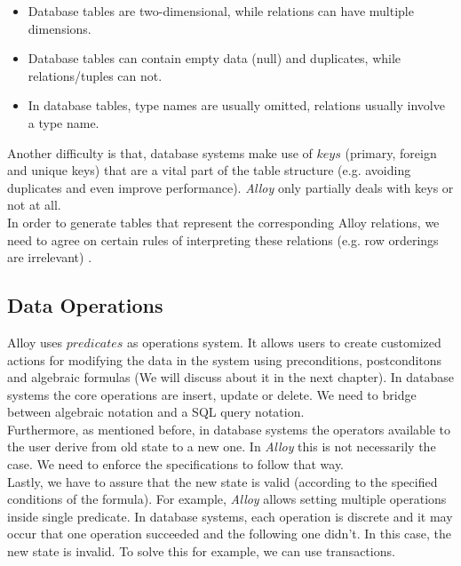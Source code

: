 \documentclass[oneside]{book}
\begin{document}
\begin{itemize}
	\item Database tables are two-dimensional, while relations can have multiple dimensions.
	\item Database tables can contain empty data (null) and duplicates, while relations/tuples can not.
	\item In database tables, type names are usually omitted, relations usually involve a type name.
\end{itemize}

Another difficulty is that, database systems make use of $keys$  (primary, foreign and unique keys) that are a vital part of the table structure (e.g. avoiding duplicates and even improve performance). \textit{Alloy} only partially deals with keys or not at all. \\

In order to generate tables that represent the corresponding Alloy relations, we need to agree on certain rules of interpreting these relations (e.g. row orderings are irrelevant) \cite[p.~151]{introtodb}.

\subsection{Data Operations}

Alloy uses $predicates$ as operations system. It allows users to create customized actions for modifying the data in the system using preconditions, postconditons and algebraic formulas (We will discuss about it in the next chapter). In database systems the core operations are insert, update or delete. We need to bridge between algebraic notation and a SQL query notation.\\

Furthermore, as mentioned before, in database systems the operators available to the user derive from old state to a new one. In \textit{Alloy} this is not necessarily the case. We need to enforce the specifications to follow that way.\\

Lastly, we have to assure that the new state is valid (according to the specified conditions of the formula). For example, \textit{Alloy} allows setting multiple operations inside single predicate. In database systems, each operation is discrete and it may occur that one operation succeeded and the following one didn't. In this case, the new state is invalid. To solve this for example, we can use transactions.\\
\end{document}
